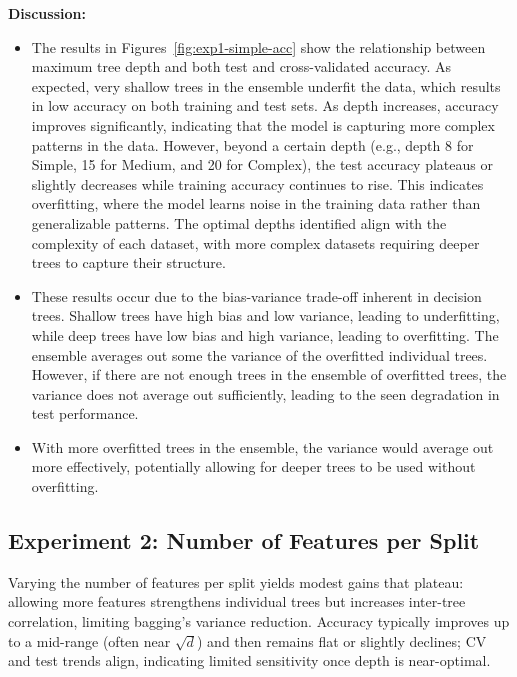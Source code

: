 \documentclass[conference]{IEEEtran}
\begin{document}
\textbf{Discussion:}
\begin{itemize}
  \item The results in Figures~\ref{fig:exp1-simple-acc} show the relationship between maximum tree depth and both test and cross-validated 
  accuracy. As expected, very shallow trees in the ensemble underfit the data, which results in low accuracy on both training and test sets. As depth 
  increases, accuracy improves significantly, indicating that the model is capturing more complex patterns in the data. However, beyond a certain depth 
  (e.g., depth 8 for Simple, 15 for Medium, and 20 for Complex), the test accuracy plateaus or slightly decreases while training accuracy 
  continues to rise. This indicates overfitting, where the model learns noise in the training data rather than generalizable patterns. The optimal 
  depths identified align with the complexity of each dataset, with more complex datasets requiring deeper trees to capture their structure.
  \item These results occur due to the bias-variance trade-off inherent in decision trees. Shallow trees have high bias and low variance, leading to 
  underfitting, while deep trees have low bias and high variance, leading to overfitting. The ensemble averages out some the variance of the overfitted individual 
  trees. However, if there are not enough trees in the ensemble of overfitted trees, the variance does not average out sufficiently, leading to the seen 
  degradation in test performance.
    \item With more overfitted trees in the ensemble, the variance would average out more effectively, potentially allowing for deeper trees to be
    used without overfitting. 
  \end{itemize}

\subsection{Experiment 2: Number of Features per Split}
\label{sec:results-exp2}
Varying the number of features per split yields modest gains that plateau: allowing more features strengthens individual trees but increases inter-tree correlation, limiting bagging’s variance reduction. Accuracy typically improves up to a mid-range (often near $\sqrt{d}$) and then remains flat or slightly declines; CV and test trends align, indicating limited sensitivity once depth is near-optimal.
\end{document}
